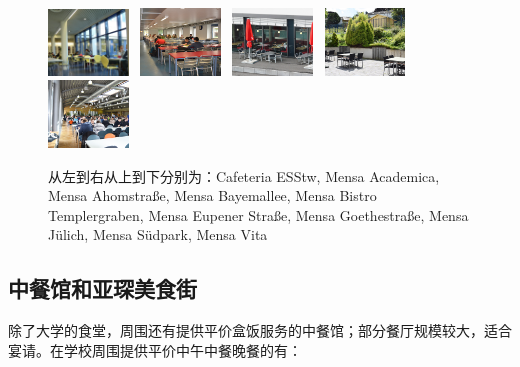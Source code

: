 \begin{figure}[h]
      \includegraphics[width=0.19\textwidth]{在亚琛学习和生活/日常消费和饮食/Mensa/mensa Eupener Strasse 2.jpg} \ \includegraphics[width=0.19\textwidth]{在亚琛学习和生活/日常消费和饮食/Mensa/Goethestrasse7.jpg} \ \includegraphics[width=0.19\textwidth]{在亚琛学习和生活/日常消费和饮食/Mensa/mensajuelich6.jpg} \ \includegraphics[width=0.19\textwidth]{在亚琛学习和生活/日常消费和饮食/Mensa/Suedpark-1.jpg} \ \includegraphics[width=0.19\textwidth]{在亚琛学习和生活/日常消费和饮食/Mensa/MensaVita2.jpg}
      \caption{从左到右从上到下分别为：Cafeteria ESStw, Mensa Academica, Mensa Ahomstraße, Mensa Bayemallee, Mensa Bistro Templergraben, Mensa Eupener Straße, Mensa Goethestraße, Mensa Jülich, Mensa Südpark, Mensa Vita}
      \label{fig:Mensen}
    \end{figure}

  \subsection{中餐馆和亚琛美食街}\label{subsec:中餐馆和亚琛美食街}

    除了大学的食堂，周围还有提供平价盒饭服务的中餐馆；部分餐厅规模较大，适合宴请。在学校周围提供平价中午中餐晚餐的有：

